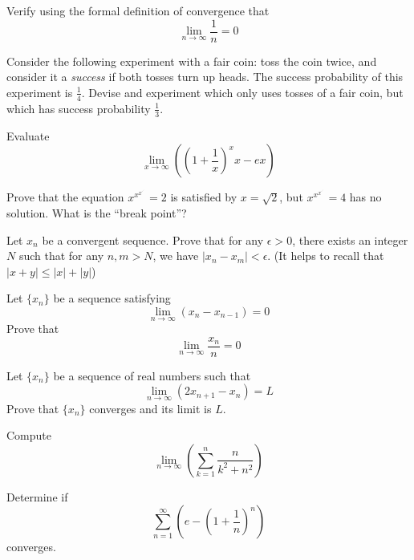 \documentclass{article}
\def\rddots#1{\cdot^{\cdot^{\cdot^{#1}}}}
\begin{document}
\begin{exercise}
Verify using the formal definition of convergence that \[\lim_{n\to\infty} \frac{1}{n} = 0\] 
\end{exercise}

\begin{exercise}
Consider the following experiment with a fair coin: toss the coin twice, and consider it a \textit{success} if both tosses turn up heads.
The success probability of this experiment is \(\frac 14\).
Devise and experiment which only uses tosses of a fair coin, but which has success probability \(\frac 13\).
\end{exercise}

\begin{exercise}
Evaluate \[\lim_{x\to\infty} \left(\left(1+\frac{1}{x}\right)^xx-ex\right)\]
\end{exercise}

\begin{exercise}
Prove that the equation \(x^{x^{x^{\rddots{}}}}=2\) is satisfied by \(x=\sqrt 2\), but \(x^{x^{x^{\rddots{}}}}=4\) has no solution.
What is the ``break point''?
\end{exercise}

\begin{exercise}
    Let $x_n$ be a convergent sequence. Prove that for any $\epsilon > 0$, there exists an integer $N$ such that for any $n,m > N$, we have $|x_n - x_m| < \epsilon$. (It helps to recall that $|x+y| \leq |x| + |y|$)
\end{exercise}

\begin{exercise}
Let $\{x_n\}$ be a sequence satisfying \[\lim_{n\to\infty} (x_n-x_{n-1}) = 0\] Prove that \[\lim_{n\to\infty} \frac{x_n}{n}= 0\]
\end{exercise}

\begin{exercise}
Let $\{x_n\}$ be a sequence of real numbers such that \[ \lim_{n\to\infty} (2x_{n+1}-x_n)=L\] Prove that $\{x_n\}$ converges and its limit is $L$.
\end{exercise}

\begin{exercise}
Compute
\[\lim_{n\to\infty}\left(\sum_{k=1}^n \frac{n}{k^2+n^2}\right)\] 
\end{exercise}

\begin{exercise}
Determine if 
\[\sum_{n = 1}^{\infty} \left(e - (1 + \frac{1}{n})^{n}\right)
\]
converges. 
\end{exercise}
\end{document}
